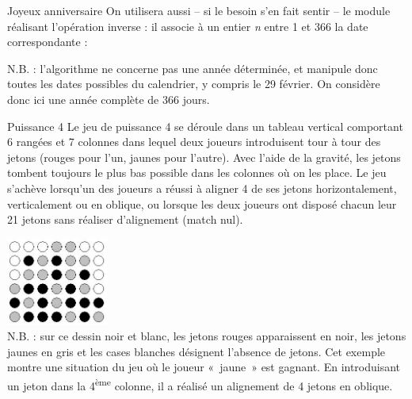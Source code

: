 \begin{Exercice}{Joyeux anniversaire}
	On utilisera aussi – si le besoin s’en fait sentir – le module réalisant
	l’opération inverse : il associe à un entier \textit{n} entre 1 et 366
	la date correspondante :
	

	N.B. : l’algorithme ne concerne pas une année déterminée, et manipule
	donc toutes les dates possibles du calendrier, y compris le 29 février.
	On considère donc ici une année complète de 366 jours.
\end{Exercice}

\begin{Exercice}{Puissance 4}
	Le jeu de puissance 4 se déroule dans un tableau vertical comportant 6
	rangées et 7 colonnes dans lequel deux joueurs introduisent tour à tour
	des jetons (rouges pour l’un, jaunes pour l’autre). Avec l’aide de la
	gravité, les jetons tombent toujours le plus bas possible dans les
	colonnes où on les place. Le jeu s’achève lorsqu’un des joueurs a
	réussi à aligner 4 de ses jetons horizontalement, verticalement ou en
	oblique, ou lorsque les deux joueurs ont disposé chacun leur 21 jetons
	sans réaliser d’alignement (match nul).


	
		\includegraphics[width=0.25\textwidth]{image/puissance4} \\
		N.B. : sur ce dessin noir et
		blanc, les jetons rouges apparaissent en noir, les jetons jaunes en
		gris et les cases blanches désignent l'absence de
		jetons. Cet exemple montre une situation du jeu où le joueur «~jaune~»
		est gagnant. En introduisant un jeton dans la
		4\textsuperscript{ème} colonne,
		il a réalisé un alignement de 4 jetons en oblique.


\end{Exercice}
